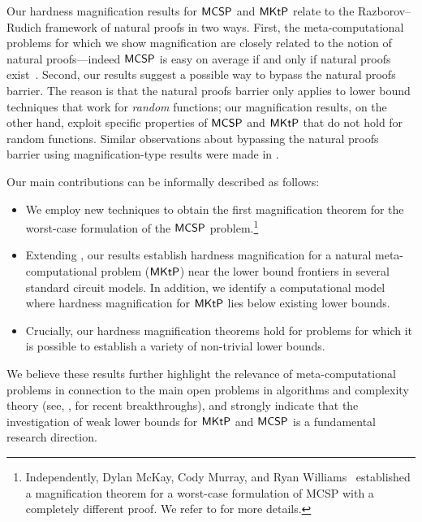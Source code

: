 \documentclass{toc}
\newcommand{\MCSP}{\ensuremath{{\sf MCSP}}\xspace}
\newcommand{\MKtP}{\ensuremath{{\sf MKtP}}\xspace}
\begin{document}
Our hardness magnification results for \MCSP and %
\MKtP %
relate to the Razborov--Rudich framework of natural proofs in two ways. First, the meta-computational problems for which we show magnification are closely related to the notion of natural proofs---indeed \MCSP is easy on average if and only if natural proofs exist~\cite{DBLP:conf/coco/HiraharaS17}. Second, our results suggest a possible way to bypass the natural proofs barrier. The reason is that the natural proofs barrier only applies to lower bound techniques
that work for \emph{random} functions; our magnification results, on the other hand, exploit specific properties of \MCSP and %
\MKtP %
that do not hold for random functions. Similar observations about bypassing the natural proofs barrier using magnification-type results were made
in \cite{DBLP:journals/jacm/AllenderK10, OS18}.

Our main contributions can be informally described as follows:


\begin{itemize}
\item[(\emph{i})] We employ new techniques to obtain the first magnification theorem for the worst-case formulation of the \MCSP problem.\footnote{Independently, Dylan McKay, Cody Murray, and Ryan Williams~\cite{STOC_paper} established a magnification theorem for a worst-case formulation of MCSP with a completely different proof. We refer to  for more details.}  
\item[(\emph{ii})] Extending \cite[Theorem 3]{OS18}, our results establish hardness magnification for a natural meta-computational problem (\MKtP) near the lower bound frontiers in several standard circuit models. In addition, we identify a computational model where hardness magnification for \MKtP lies below existing lower bounds. 
\item[(\emph{iii})] Crucially, our hardness magnification theorems hold for problems for which it is possible to establish a variety of non-trivial lower bounds.
\end{itemize}

We believe these results further highlight the relevance of meta-computational problems in connection to the main open problems in algorithms and complexity theory (see, \eg, \cite{DBLP:journals/jacm/Williams14, DBLP:conf/coco/CarmosinoIKK16} for recent breakthroughs), and strongly indicate that the investigation of weak lower bounds for $\MKtP$ and $\MCSP$ is a fundamental research direction.  
\end{document}
